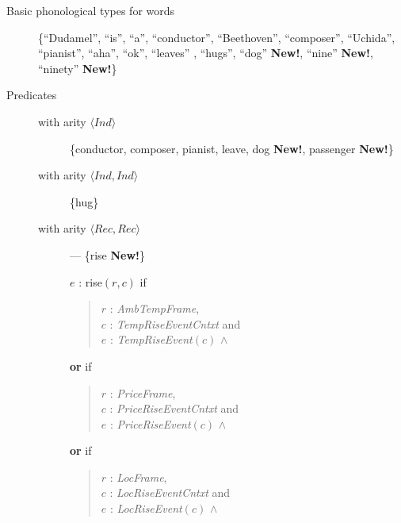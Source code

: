 \begin{description}

  
\item[Basic phonological  types for words] \mbox{}

  \{``Dudamel'', ``is'', ``a'', ``conductor'', ``Beethoven'',
  ``composer'', ``Uchida'', ``pianist'', ``aha'', ``ok'', ``leaves''
  , ``hugs'', ``dog'' \textbf{New!}, ``nine'' \textbf{New!},
  ``ninety'' \textbf{New!}\}



  
\item[Predicates] \mbox{}
  
  \begin{description}
  
  \item[with arity \textnormal{$\langle\textit{Ind}\rangle$}]
    \{conductor, composer, pianist, leave,  dog \textbf{New!},
    passenger \textbf{New!}\}
    
  \item[with arity
    \textnormal{$\langle\textit{Ind},\textit{Ind}\rangle$}] \{hug\}

    \item[with arity
  \textnormal{$\langle\textit{Rec},\textit{Rec}\rangle$}] --- \{rise
  \textbf{New!}\}

      $e$ : rise$(r,c)$ if
  \begin{quote}
    $r$ : \textit{AmbTempFrame},\\
    $c$ : \textit{TempRiseEventCntxt} and \\
    $e$ : \textit{TempRiseEvent}$(c)$ \d{$\wedge$}
  \end{quote}
  \textbf{or} if
  \begin{quote}
    $r$ : \textit{PriceFrame},\\
    $c$ : \textit{PriceRiseEventCntxt} and \\
    $e$ : \textit{PriceRiseEvent}$(c)$ \d{$\wedge$}
  \end{quote}
  \textbf{or} if
  \begin{quote}
    $r$ : \textit{LocFrame},\\
    $c$ : \textit{LocRiseEventCntxt} and \\
    $e$ : \textit{LocRiseEvent}$(c)$ \d{$\wedge$}
  \end{quote}


\end{description}
\end{description}
